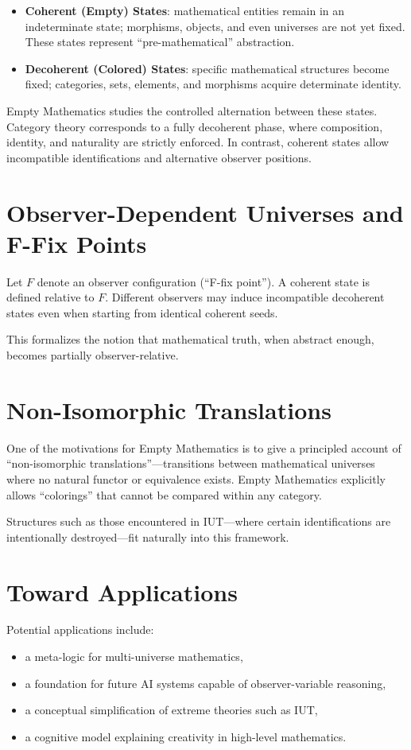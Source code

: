 \documentclass[11pt]{article}
\begin{document}
\begin{itemize}
    \item \textbf{Coherent (Empty) States}: mathematical entities remain in an indeterminate state;
    morphisms, objects, and even universes are not yet fixed. These states represent ``pre-mathematical''
    abstraction.
    \item \textbf{Decoherent (Colored) States}: specific mathematical structures become fixed;
    categories, sets, elements, and morphisms acquire determinate identity.
\end{itemize}

Empty Mathematics studies the controlled alternation between these states. Category theory corresponds to a fully decoherent phase, where composition, identity, and naturality are strictly enforced. In contrast, coherent states allow incompatible identifications and alternative observer positions.

\section{Observer-Dependent Universes and F-Fix Points}
Let $F$ denote an observer configuration (``F-fix point''). A coherent state is defined relative to $F$.
Different observers may induce incompatible decoherent states even when starting from identical coherent seeds.

This formalizes the notion that mathematical truth, when abstract enough, becomes partially observer-relative.

\section{Non-Isomorphic Translations}
One of the motivations for Empty Mathematics is to give a principled account of ``non-isomorphic translations''---transitions between mathematical universes where no natural functor or equivalence exists.
Empty Mathematics explicitly allows ``colorings'' that cannot be compared within any category.

Structures such as those encountered in IUT---where certain identifications are intentionally destroyed---fit naturally into this framework.

\section{Toward Applications}
Potential applications include:

\begin{itemize}
    \item a meta-logic for multi-universe mathematics,
    \item a foundation for future AI systems capable of observer-variable reasoning,
    \item a conceptual simplification of extreme theories such as IUT,
    \item a cognitive model explaining creativity in high-level mathematics.
\end{itemize}
\end{document}
